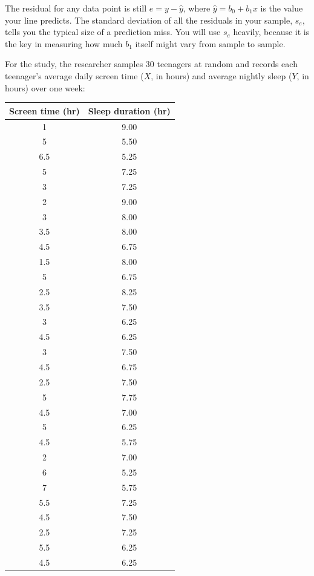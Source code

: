The residual for any data point is still $e = y - \hat{y}$, where $\hat{y} = b_0 + b_1x$ is the value your line predicts. The standard deviation of all the residuals in your sample, $s_e$, tells you the typical size of a prediction miss. You will use $s_e$ heavily, because it is the key in measuring how much $b_1$ itself might vary from sample to sample.

For the study, the researcher samples $30$ teenagers at random and records each teenager's average daily screen time ($X$, in hours) and average nightly sleep ($Y$, in hours) over one week:

\begin{center}
\begin{tabular}{|c|c|}
\hline
Screen time (hr) & Sleep duration (hr) \\
\hline
1 & 9.00 \\
5 & 5.50 \\
6.5 & 5.25 \\
5 & 7.25 \\
3 & 7.25 \\
2 & 9.00 \\
3 & 8.00 \\
3.5 & 8.00 \\
4.5 & 6.75 \\
1.5 & 8.00 \\
5 & 6.75 \\
2.5 & 8.25 \\
3.5 & 7.50 \\
3 & 6.25 \\
4.5 & 6.25 \\
3 & 7.50 \\
4.5 & 6.75 \\
2.5 & 7.50 \\
5 & 7.75 \\
4.5 & 7.00 \\
5 & 6.25 \\
4.5 & 5.75 \\
2 & 7.00 \\
6 & 5.25 \\
7 & 5.75 \\
5.5 & 7.25 \\
4.5 & 7.50 \\
2.5 & 7.25 \\
5.5 & 6.25 \\
4.5 & 6.25 \\
\hline
\end{tabular}
\end{center}

